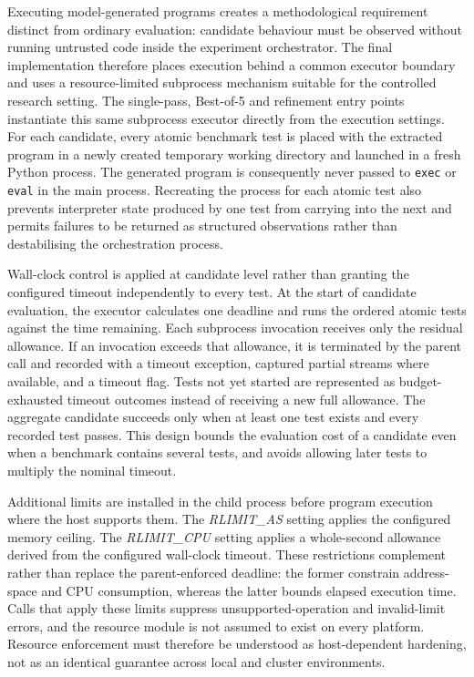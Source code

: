 Executing model-generated programs creates a methodological requirement distinct from ordinary evaluation: candidate behaviour must be observed without running untrusted code inside the experiment orchestrator. The final implementation therefore places execution behind a common executor boundary and uses a resource-limited subprocess mechanism suitable for the controlled research setting. The single-pass, Best-of-5 and refinement entry points instantiate this same subprocess executor directly from the execution settings. For each candidate, every atomic benchmark test is placed with the extracted program in a newly created temporary working directory and launched in a fresh Python process. The generated program is consequently never passed to \texttt{exec} or \texttt{eval} in the main process. Recreating the process for each atomic test also prevents interpreter state produced by one test from carrying into the next and permits failures to be returned as structured observations rather than destabilising the orchestration process.

Wall-clock control is applied at candidate level rather than granting the configured timeout independently to every test. At the start of candidate evaluation, the executor calculates one deadline and runs the ordered atomic tests against the time remaining. Each subprocess invocation receives only the residual allowance. If an invocation exceeds that allowance, it is terminated by the parent call and recorded with a timeout exception, captured partial streams where available, and a timeout flag. Tests not yet started are represented as budget-exhausted timeout outcomes instead of receiving a new full allowance. The aggregate candidate succeeds only when at least one test exists and every recorded test passes. This design bounds the evaluation cost of a candidate even when a benchmark contains several tests, and avoids allowing later tests to multiply the nominal timeout.

Additional limits are installed in the child process before program execution where the host supports them. The \textit{RLIMIT\_AS} setting applies the configured memory ceiling. The \textit{RLIMIT\_CPU} setting applies a whole-second allowance derived from the configured wall-clock timeout. These restrictions complement rather than replace the parent-enforced deadline: the former constrain address-space and CPU consumption, whereas the latter bounds elapsed execution time. Calls that apply these limits suppress unsupported-operation and invalid-limit errors, and the resource module is not assumed to exist on every platform. Resource enforcement must therefore be understood as host-dependent hardening, not as an identical guarantee across local and cluster environments.

